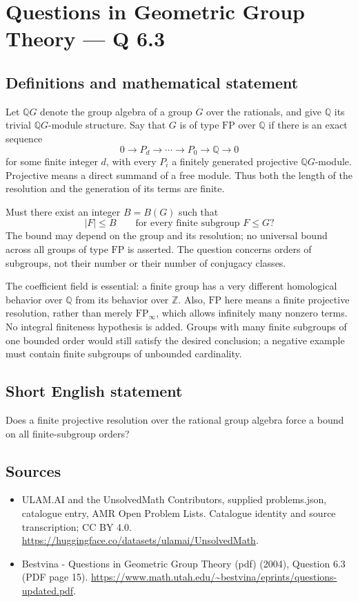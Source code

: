 \documentclass[11pt,a4paper]{article}
\begin{document}
\section*{Questions in Geometric Group Theory — Q 6.3}\label{statement}

\subsection{Definitions and mathematical statement}
Let $\mathbb QG$ denote the group algebra of a group $G$ over the rationals, and give $\mathbb Q$ its trivial $\mathbb QG$-module structure. Say that $G$ is of type $\mathrm{FP}$ over $\mathbb Q$ if there is an exact sequence
\[
 0\longrightarrow P_d\longrightarrow\cdots\longrightarrow P_0
     \longrightarrow\mathbb Q\longrightarrow0
\]
for some finite integer $d$, with every $P_i$ a finitely generated projective $\mathbb QG$-module. Projective means a direct summand of a free module. Thus both the length of the resolution and the generation of its terms are finite.

Must there exist an integer $B=B(G)$ such that
\[
 |F|\leq B\qquad\text{for every finite subgroup }F\leq G?
\]
The bound may depend on the group and its resolution; no universal bound across all groups of type $\mathrm{FP}$ is asserted. The question concerns orders of subgroups, not their number or their number of conjugacy classes.

The coefficient field is essential: a finite group has a very different homological behavior over $\mathbb Q$ from its behavior over $\mathbb Z$. Also, $\mathrm{FP}$ here means a finite projective resolution, rather than merely $\mathrm{FP}_{\infty}$, which allows infinitely many nonzero terms. No integral finiteness hypothesis is added. Groups with many finite subgroups of one bounded order would still satisfy the desired conclusion; a negative example must contain finite subgroups of unbounded cardinality.
\subsection{Short English statement}
Does a finite projective resolution over the rational group algebra force a bound on all finite-subgroup orders?
\subsection{Sources}
\begin{itemize}
\item[S1] ULAM.AI and the UnsolvedMath Contributors, supplied problems.json, catalogue entry, AMR Open Problem Lists. Catalogue identity and source transcription; CC BY 4.0.
\url{https://huggingface.co/datasets/ulamai/UnsolvedMath}.
\item[S2] Bestvina - Questions in Geometric Group Theory (pdf) (2004), Question 6.3 (PDF page 15). 
\url{https://www.math.utah.edu/~bestvina/eprints/questions-updated.pdf}.
\end{itemize}
\end{document}
